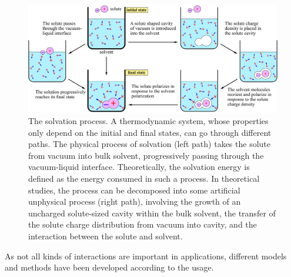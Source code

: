 \begin{figure}[h]
\centering{}\textcolor{red}{}%
\noindent\begin{minipage}[t]{1\textwidth}%
\begin{center}
\includegraphics[width=1\columnwidth]{_figure/solvation}\caption[The solvation process]{The solvation process.\label{fig:Process-of-solvation} A thermodynamic
system, whose properties only depend on the initial and final states,
can go through different paths. The physical process of solvation
(left path) takes the solute from vacuum into bulk solvent, progressively
passing through the vacuum-liquid interface. Theoretically, the solvation
energy is defined as the energy consumed in such a process. In theoretical
studies, the process can be decomposed into some artificial unphysical
process (right path), involving the growth of an uncharged solute-sized
cavity within the bulk solvent, the transfer of the solute charge
distribution from vacuum into cavity, and the interaction between
the solute and solvent.}
\par\end{center}%
\end{minipage}
\end{figure}

As not all kinds of interactions are important in applications, different
models and methods have been developed according to the usage.

